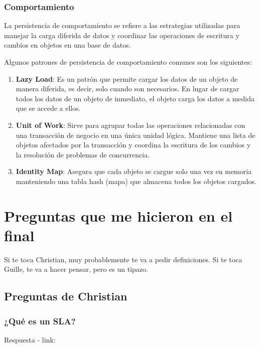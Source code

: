 \documentclass{article}
\begin{document}
		\subsubsection{Comportamiento}
		La persistencia de comportamiento se refiere a las estrategias utilizadas para manejar la carga diferida de datos y coordinar las operaciones de escritura y cambios en objetos en una base de datos.
		
		Algunos patrones de persistencia de comportamiento comunes son los siguientes:
		
			\begin{enumerate}
			\item {\textbf{Lazy Load}}: Es un patrón que permite cargar los datos de un objeto de manera diferida, es decir, solo cuando son necesarios. En lugar de cargar todos los datos de un objeto de inmediato, el objeto carga los datos a medida que se accede a ellos.
			
			\item {\textbf{Unit of Work}}: Sirve para agrupar todas las operaciones relacionadas con una transacción de negocio en una única unidad lógica. Mantiene una lista de objetos afectados por la transacción y coordina la escritura de los cambios y la resolución de problemas de concurrencia.
			
			
			\item {\textbf{Identity Map}}: Asegura que cada objeto se cargue solo una vez en memoria manteniendo una tabla hash (mapa) que almacena todos los objetos cargados.
			
		\end{enumerate}






  \section{Preguntas que me hicieron en el final}
  Si te toca Christian, muy probablemente te va a pedir definiciones. Si te toca Guille, te va a hacer pensar, pero es un tipazo.
   \subsection{Preguntas de Christian}
    \subsubsection{¿Qué es un SLA?}
    Respuesta - link: \textbf{~}
\end{document}

